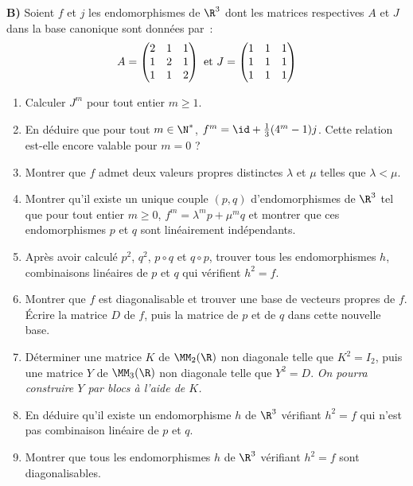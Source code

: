 \documentclass[twoside,french,11pt]{VcCours}
\begin{document}
{\bf B)} Soient $f$ et $j$ les endomorphismes de $\R^3$ dont les matrices respectives $A$ et $J$ dans la base canonique sont données par~:
$$
A=
\begin{pmatrix}
2 & 1 & 1 \\
1 & 2 & 1 \\
1 & 1 & 2
\end{pmatrix}
\ \hbox{et} \ 
J=
\begin{pmatrix}
1 & 1 & 1 \\
1 & 1 & 1 \\
1 & 1 & 1 \\
\end{pmatrix}
$$
\begin{enumerate}
\item Calculer $J^m$ pour tout entier $m \ge 1$.
\item En déduire que pour tout $m \in \N^*$, $f^m=\id + \frac13 (4^m-1) j$. Cette relation est-elle encore valable pour $m=0$ ?
\item Montrer que $f$ admet deux valeurs propres distinctes $\lambda$ et $\mu$ telles que $\lambda<\mu$.
\item Montrer qu'il existe un unique couple $(p,q)$ d'endomorphismes de $\R^3$ tel que pour tout entier $m \ge 0$, $f^m=\lambda^m p + \mu^m q$ et montrer que ces endomorphismes $p$ et $q$ sont linéairement indépendants.
\item Après avoir calculé $p^2$, $q^2$, $p \circ q$ et $q \circ p$, trouver tous les endomorphismes $h$, combinaisons linéaires de $p$ et $q$ qui vérifient $h^2=f$.
\item Montrer que $f$ est diagonalisable et trouver une base de vecteurs propres de $f$. Écrire la matrice $D$ de $f$, puis la matrice de $p$ et de $q$ dans cette nouvelle base.
\item Déterminer une matrice $K$ de $\MM_2(\R)$ non diagonale telle que $K^2=I_2$, puis une matrice $Y$ de $\MM_3(\R)$ non diagonale telle que $Y^2=D$. \textit{On pourra construire $Y$ par blocs à l'aide de $K$.}
\item En déduire qu'il existe un endomorphisme $h$ de $\R^3$ vérifiant $h^2=f$ qui n'est pas combinaison linéaire de $p$ et $q$.
\item Montrer que tous les endomorphismes $h$ de $\R^3$ vérifiant $h^2=f$ sont diagonalisables.
\end{enumerate}
\end{document}
